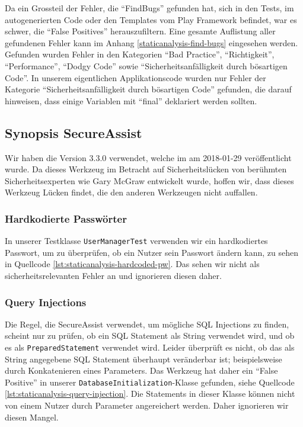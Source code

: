 \documentclass[12pt,DIV14,BCOR10mm,a4paper,twoside,parskip=half-,headsepline,headinclude,english,ngerman,bibliography=totocnumbered]{scrreprt}
\begin{document}
Da ein Grossteil der Fehler, die \enquote{FindBugs} gefunden hat, sich in den Tests, im autogenerierten Code oder den Templates vom Play Framework befindet, war es schwer, die \enquote{False Positives} herauszufiltern.
Eine gesamte Auflistung aller gefundenen Fehler kann im Anhang \ref{staticanalysis-find-bugs} eingesehen werden.
Gefunden wurden Fehler in den Kategorien \enquote{Bad Practice}, \enquote{Richtigkeit}, \enquote{Performance}, \enquote{Dodgy Code} sowie \enquote{Sicherheitsanfälligkeit durch bösartigen Code}.
In unserem eigentlichen Applikationscode wurden nur Fehler der Kategorie \enquote{Sicherheitsanfälligkeit durch bösartigen Code} gefunden, die darauf hinweisen, dass einige Variablen mit \enquote{final} deklariert werden sollten.

\subsection{Synopsis SecureAssist}

Wir haben die Version 3.3.0 verwendet, welche im am 2018-01-29 veröffentlicht wurde.
Da dieses Werkzeug im Betracht auf Sicherheitslücken von berühmten Sicherheitsexperten wie Gary McGraw entwickelt wurde, hoffen wir, dass dieses Werkzeug Lücken findet, die den anderen Werkzeugen nicht auffallen.

\subsubsection{Hardkodierte Passwörter}

In unserer Testklasse \texttt{UserManagerTest} verwenden wir ein hardkodiertes Passwort, um zu überprüfen, ob ein Nutzer sein Passwort ändern kann, zu sehen in Quellcode \ref{lst:staticanalysis-hardcoded-pw}.
Das sehen wir nicht als sicherheitsrelevanten Fehler an und ignorieren diesen daher.

\subsubsection{Query Injections}

Die Regel, die SecureAssist verwendet, um mögliche SQL Injections zu finden, scheint nur zu prüfen, ob ein SQL Statement als String verwendet wird, und ob es als \texttt{PreparedStatement} verwendet wird.
Leider überprüft es nicht, ob das als String angegebene SQL Statement überhaupt veränderbar ist; beispielsweise durch Konkatenieren eines Parameters.
Das Werkzeug hat daher ein \enquote{False Positive} in unserer \texttt{DatabaseInitialization}-Klasse gefunden, siehe Quellcode \ref{lst:staticanalysis-query-injection}.
Die Statements in dieser Klasse können nicht von einem Nutzer durch Parameter angereichert werden. Daher ignorieren wir diesen Mangel.
\end{document}
